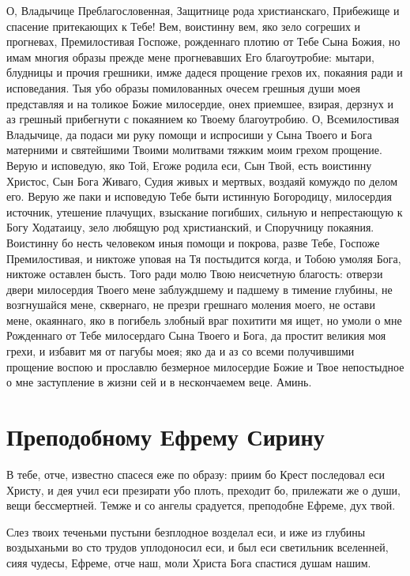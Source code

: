 О, Владычице Преблагословенная, Защитнице рода христианскаго, Прибежище и спасение притекающих к Тебе! Вем, воистинну вем, яко зело согреших и прогневах, Премилостивая Госпоже, рожденнаго плотию от Тебе Сына Божия, но имам многия образы прежде мене прогневавших Его благоутробие: мытари, блудницы и прочия грешники, имже дадеся прощение грехов их, покаяния ради и исповедания. Тыя убо образы помилованных очесем грешныя души моея представляя и на толикое Божие милосердие, онех приемшее, взирая, дерзнух и аз грешный прибегнути с покаянием ко Твоему благоутробию. О, Всемилостивая Владычице, да подаси ми руку помощи и испросиши у Сына Твоего и Бога матерними и святейшими Твоими молитвами тяжким моим грехом прощение. Верую и исповедую, яко Той, Егоже родила еси, Сын Твой, есть воистинну Христос, Сын Бога Живаго, Судия живых и мертвых, воздаяй комуждо по делом его. Верую же паки и исповедую Тебе быти истинную Богородицу, милосердия источник, утешение плачущих, взыскание погибших, сильную и непрестающую к Богу Ходатаицу, зело любящую род христианский, и Споручницу покаяния. Воистинну бо несть человеком иныя помощи и покрова, разве Тебе, Госпоже Премилостивая, и никтоже уповая на Тя постыдится когда, и Тобою умоляя Бога, никтоже оставлен бысть. Того ради молю Твою неисчетную благость: отверзи двери милосердия Твоего мене заблуждшему и падшему в тимение глубины, не возгнушайся мене, сквернаго, не презри грешнаго моления моего, не остави мене, окаяннаго, яко в погибель злобный враг похитити мя ищет, но умоли о мне Рожденнаго от Тебе милосердаго Сына Твоего и Бога, да простит великия моя грехи, и избавит мя от пагубы моея; яко да и аз со всеми получившими прощение воспою и прославлю безмерное милосердие Божие и Твое непостыдное о мне заступление в жизни сей и в нескончаемем веце. Аминь.


\section{Преподобному Ефрему Сирину}
 




В тебе, отче, известно спасеся еже по образу: приим бо Крест последовал еси Христу, и дея учил еси презирати убо плоть, преходит бо, прилежати же о души, вещи бессмертней. Темже и со ангелы срадуется, преподобне Ефреме, дух твой.




Слез твоих теченьми пустыни безплодное возделал еси, и иже из глубины воздыханьми во сто трудов уплодоносил еси, и был еси светильник вселенней, сияя чудесы, Ефреме, отче наш, моли Христа Бога спастися душам нашим.


